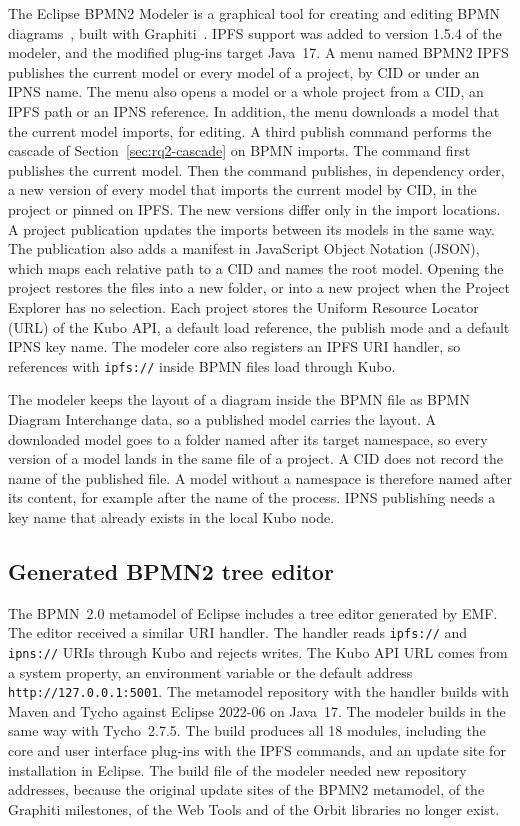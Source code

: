 \documentclass[5p,times,twocolumn]{elsarticle}
\theoremstyle{definition}
\theoremstyle{plain}
\begin{document}
The Eclipse BPMN2 Modeler is a graphical tool for creating and editing BPMN diagrams~\cite{bpmn2modeler,omg2010bpmn}, built with Graphiti~\cite{graphiti}. IPFS support was added to version 1.5.4 of the modeler, and the modified plug-ins target Java~17. A menu named BPMN2 IPFS publishes the current model or every model of a project, by CID or under an IPNS name. The menu also opens a model or a whole project from a CID, an IPFS path or an IPNS reference. In addition, the menu downloads a model that the current model imports, for editing. A third publish command performs the cascade of Section~\ref{sec:rq2-cascade} on BPMN imports. The command first publishes the current model. Then the command publishes, in dependency order, a new version of every model that imports the current model by CID, in the project or pinned on IPFS. The new versions differ only in the import locations. A project publication updates the imports between its models in the same way. The publication also adds a manifest in JavaScript Object Notation (JSON), which maps each relative path to a CID and names the root model. Opening the project restores the files into a new folder, or into a new project when the Project Explorer has no selection. Each project stores the Uniform Resource Locator (URL) of the Kubo API, a default load reference, the publish mode and a default IPNS key name. The modeler core also registers an IPFS URI handler, so references with \texttt{ipfs://} inside BPMN files load through Kubo.

The modeler keeps the layout of a diagram inside the BPMN file as BPMN Diagram Interchange data, so a published model carries the layout. A downloaded model goes to a folder named after its target namespace, so every version of a model lands in the same file of a project. A CID does not record the name of the published file. A model without a namespace is therefore named after its content, for example after the name of the process. IPNS publishing needs a key name that already exists in the local Kubo node.

\subsection{Generated BPMN2 tree editor}\label{sec:tool-editor}

The BPMN~2.0 metamodel of Eclipse includes a tree editor generated by EMF. The editor received a similar URI handler. The handler reads \texttt{ipfs://} and \texttt{ipns://} URIs through Kubo and rejects writes. The Kubo API URL comes from a system property, an environment variable or the default address \texttt{http://127.0.0.1:5001}. The metamodel repository with the handler builds with Maven and Tycho against Eclipse 2022-06 on Java~17. The modeler builds in the same way with Tycho~2.7.5. The build produces all 18 modules, including the core and user interface plug-ins with the IPFS commands, and an update site for installation in Eclipse. The build file of the modeler needed new repository addresses, because the original update sites of the BPMN2 metamodel, of the Graphiti milestones, of the Web Tools and of the Orbit libraries no longer exist.
\end{document}
